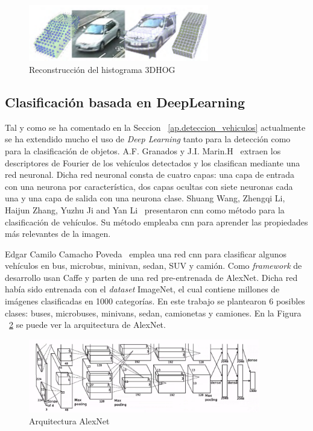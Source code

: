 \begin{figure}[H]
  \begin{center}
    \includegraphics[width=0.7\textwidth]{figures/Estado_arte/3dhog_plantilla.png}
		\caption{Reconstrucción  del  histograma  3DHOG}
		\label{fig.3dhog_histograma}
		\end{center}
\end{figure}

\subsection{Clasificación basada en DeepLearning}
Tal y como se ha comentado en la Seccion ~\ref{ap.deteccion_vehiculos} actualmente se ha extendido mucho el uso de \textit{Deep Learning} tanto para la detección como para la clasificación de objetos. 
A.F. Granados y J.I. Marin.H~\cite{deteccion_flujo_vehicular} extraen los descriptores de Fourier de los vehículos detectados y los clasifican mediante una red neuronal. Dicha red neuronal consta de cuatro capas: una capa de entrada con una neurona por característica, dos capas ocultas con siete neuronas cada una y una capa de salida con una neurona clase. 
Shuang Wang, Zhengqi Li, Haijun Zhang, Yuzhu Ji and Yan Li~\cite{classify_vechicle_estado} presentaron \acrfull{cnn} como método para la clasificación de vehículos. Su método empleaba \acrshort{cnn} para aprender las propiedades más relevantes de la imagen.


Edgar Camilo Camacho Poveda~\cite{edgar} emplea una red \acrshort{cnn} para clasificar algunos vehículos en bus, microbus, minivan, sedan, SUV y camión. Como \textit{framework} de desarrollo usan Caffe y parten de una red pre-entrenada de AlexNet. Dicha red había sido entrenada con el \textit{dataset} ImageNet, el cual contiene millones de imágenes clasificadas en 1000 categorías. En este trabajo se plantearon 6 posibles clases: buses, microbuses, minivans, sedan, camionetas y camiones. En la Figura ~\ref{fig.alexnet} se puede ver la arquitectura de AlexNet.

 \begin{figure}[H] 
\begin{center}
	\includegraphics[width=0.9\textwidth]{figures/Estado_arte/AlexNet.png}
   \caption{Arquitectura AlexNet}
	\label{fig.alexnet}
\end{center}
\end{figure}



